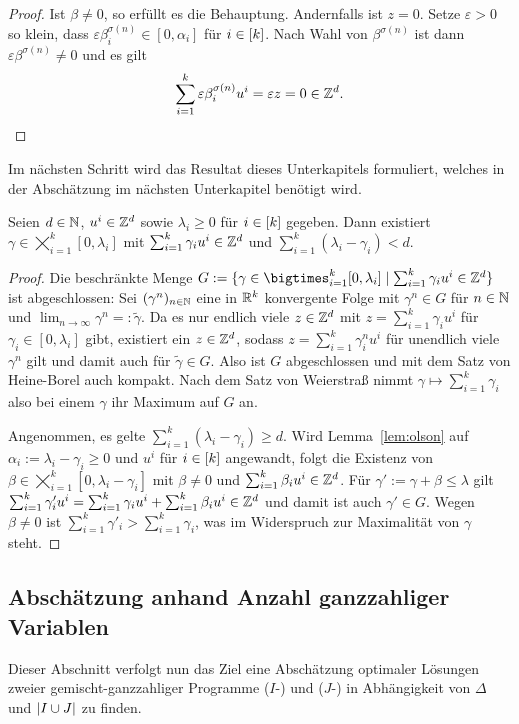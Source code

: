\begin{proof}
	Ist $\beta\neq0$, so erfüllt es die Behauptung.
	Andernfalls ist $z=0$.
	Setze $\varepsilon>0$ so klein, dass $\varepsilon\beta^{\sigma(n)}_i\in[0,\alpha_i]$ für $i\in[k]$.
	Nach Wahl von $\beta^{\sigma(n)}$ ist dann $\varepsilon\beta^{\sigma(n)}\neq0$ und es gilt $$\sum_{i=1}^k\varepsilon\beta^{\sigma(n)}_iu^i=\varepsilon z=0\in\mathbb{Z}^d.$$
\end{proof}

Im nächsten Schritt wird das Resultat dieses Unterkapitels formuliert, welches in der Abschätzung im nächsten Unterkapitel benötigt wird.

\begin{lemma}\label{lem:maxgamma}
	Seien $d\in\mathbb{N}$, $u^i\in\mathbb{Z}^d$ sowie $\lambda_i\geq0$ für $i\in[k]$ gegeben.
	Dann existiert $\gamma\in\bigtimes_{i=1}^k [0,\lambda_i]$ mit $\sum_{i=1}^k \gamma_i u^i\in\mathbb{Z}^d$ und  $\sum_{i=1}^k(\lambda_i-\gamma_i)<d$.
\end{lemma}
\begin{proof}
	Die beschränkte Menge $G:=\{\gamma \in \bigtimes_{i=1}^k [0,\lambda_i] \mid \sum_{i=1}^k \gamma_i u^i\in\Z^d \}$ ist abgeschlossen: Sei $(\gamma^n)_{n\in\mathbb{N}}$ eine in $\mathbb{R}^k$ konvergente Folge mit $\gamma^n\in G$ für $n\in\mathbb{N}$ und $\lim_{n\to\infty}\gamma^n=:\tilde{\gamma}$.
	Da es nur endlich viele $z\in\mathbb{Z}^d$ mit $z=\sum_{i=1}^k\gamma_iu^i$ für $\gamma_i\in[0,\lambda_i]$ gibt, existiert ein $z\in\mathbb{Z}^d$, sodass $z=\sum_{i=1}^k\gamma^n_iu^i$ für unendlich viele $\gamma^n$ gilt und damit auch für $\tilde{\gamma}\in G$.
	Also ist $G$ abgeschlossen und mit dem Satz von Heine-Borel auch kompakt.
	Nach dem Satz von Weierstraß nimmt $\gamma \mapsto \sum_{i=1}^k\gamma_i$ also bei einem $\gamma$ ihr Maximum auf $G$ an.
	
	Angenommen, es gelte $\sum_{i=1}^k(\lambda_i - \gamma_i) \geq d$.
	Wird Lemma~\ref{lem:olson} auf $\alpha_i:=\lambda_i-\gamma_i\geq0$ und $u^i$ für $i\in[k]$ angewandt, folgt die Existenz von $\beta\in\bigtimes_{i=1}^k[0,\lambda_i-\gamma_i]$ mit $\beta\neq0$ und $\sum_{i=1}^k \beta_i u^i\in\mathbb{Z}^d$.
	Für $\gamma':=\gamma+\beta\leq\lambda$ gilt 
	$
	\sum_{i=1}^k\gamma'_iu^i = \sum_{i=1}^k\gamma_iu^i + \sum_{i=1}^k \beta_iu^i\in\mathbb{Z}^d
	$
	und damit ist auch $\gamma'\in G$.
	Wegen $\beta\neq0$ ist $\sum_{i=1}^k\gamma'_i > \sum_{i=1}^k\gamma_i$, was im Widerspruch zur Maximalität von $\gamma$ steht.
\end{proof}

\subsection{Abschätzung anhand Anzahl ganzzahliger Variablen}
Dieser Abschnitt verfolgt nun das Ziel eine Abschätzung optimaler Lösungen zweier gemischt-ganzzahliger Programme	($I$-\MIPR) und ($J$-\MIPR) in Abhängigkeit von $\Delta$ und $\lvert I\cup J \rvert$ zu finden.

